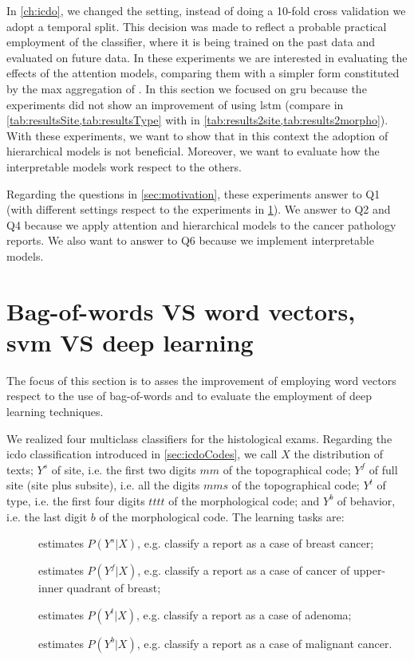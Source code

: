 In \cref{ch:icdo}, we changed the setting, instead of doing a 10-fold
cross validation we adopt a temporal split. This decision was made to
reflect a probable practical employment of the classifier, where it is
being trained on the past data and evaluated on future data. In these
experiments we are interested in evaluating the effects of the
attention models, comparing them with a simpler form constituted by
the max aggregation of \maxp{}. In this section we focused on \ac{gru}
because the experiments did not show an improvement of using
\ac{lstm} (compare \lstmb{} in \cref{tab:resultsSite,tab:resultsType}
with \gru{} in \cref{tab:results2site,tab:results2morpho}). With these
experiments, we want to show that in this context 
the adoption of hierarchical models is not beneficial. Moreover, we
want to evaluate how the interpretable models work respect to the
others.

Regarding the questions in \cref{sec:motivation}, these experiments
answer to Q1 (with different settings respect to the experiments in
\cref{ch:icdoFirst}). We answer to Q2 and Q4 because we apply attention and
hierarchical models to the cancer pathology reports. We also want to
answer to Q6 because we implement interpretable models. 


\section{Bag-of-words VS word vectors, \ac{svm} VS deep learning}
\label{ch:icdoFirst}
The focus of this section is to asses the improvement of employing
word vectors respect to the use of bag-of-words and to evaluate the
employment of deep learning techniques.

We realized four multiclass classifiers for the
histological exams. Regarding the \ac{icdo} classification introduced
in \cref{sec:icdoCodes}, we call $X$ the distribution of texts; $Y^s$
of site, i.e. the first two digits $mm$ of the topographical code; $Y^f$ of
full site (site plus subsite), i.e. all the digits $mms$ of the
topographical code; $Y^t$ of type, i.e. the first four digits $tttt$ of the
morphological code; and
$Y^b$ of behavior, i.e. the last digit $b$ of the morphological
code. The learning tasks are:
\begin{description}
  \item[\site{}] estimates $P(Y^s|X)$, e.g. classify a report as a
    case of breast cancer;
  \item[\fullSite{}] estimates $P(Y^f|X)$, e.g. classify a report as a
    case of cancer of upper-inner quadrant of breast;
  \item[\type{}] estimates $P(Y^t|X)$, e.g. classify a report as a
    case of adenoma;
  \item[\behaviour{}] estimates $P(Y^b|X)$, e.g. classify a report as
    a case of malignant cancer.
\end{description}

